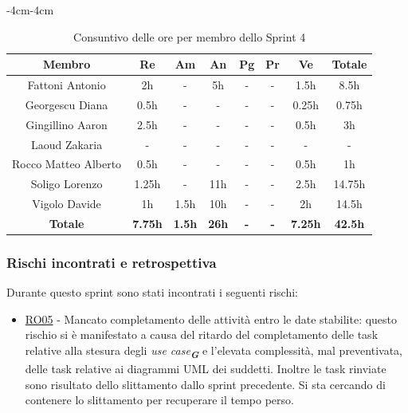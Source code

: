 \documentclass[a4paper,12pt]{article}
\newcommand{\glossario}[1]{\textit{#1}\textsubscript{\textbf{\textit{\textcolor{lightblack}{G}}}}}
\begin{document}
\begin{table}[H]
    \begin{adjustwidth}{-4cm}{-4cm}
    \centering
    \begin{tabular}{|c|c|c|c|c|c|c|c|}
        \hline
        \textbf{Membro} & \textbf{Re} & \textbf{Am}  & \textbf{An} & \textbf{Pg} & \textbf{Pr} & \textbf{Ve} & \textbf{Totale} \\
        \hline
        Fattoni Antonio & 2h & - & 5h & - & - & 1.5h & 8.5h \\
        \hline
        Georgescu Diana & 0.5h & - & - & - & - & 0.25h & 0.75h \\
        \hline
        Gingillino Aaron & 2.5h & - & - & - & - & 0.5h & 3h \\
        \hline
        Laoud Zakaria & - & - & - & - & - & - & - \\
        \hline
        Rocco Matteo Alberto & 0.5h & - & - & - & - & 0.5h & 1h \\
        \hline
        Soligo Lorenzo & 1.25h & - & 11h & - & - & 2.5h & 14.75h \\
        \hline
        Vigolo Davide & 1h & 1.5h & 10h & - & - & 2h & 14.5h \\
        \hline
        \textbf{Totale} & \textbf{7.75h} & \textbf{1.5h} & \textbf{26h} & \textbf{-} & \textbf{-} & \textbf{7.25h} & \textbf{42.5h} \\
        \hline
    \end{tabular}
    \caption{Consuntivo delle ore per membro dello Sprint 4}
    \end{adjustwidth}
\end{table}

\subsubsection{Rischi incontrati e retrospettiva}
Durante questo sprint sono stati incontrati i seguenti rischi:
\begin{itemize}
    \item \hyperref[RO05]{RO05} - Mancato completamento delle attività entro le date stabilite: questo rischio si è manifestato a causa del ritardo del completamento delle task relative alla stesura degli \glossario{use case} e l'elevata complessità, mal preventivata, delle task relative ai diagrammi UML dei suddetti. Inoltre le task rinviate sono risultato dello slittamento dallo sprint precedente. Si sta cercando di contenere lo slittamento per recuperare il tempo perso.
\end{itemize}
\end{document}
